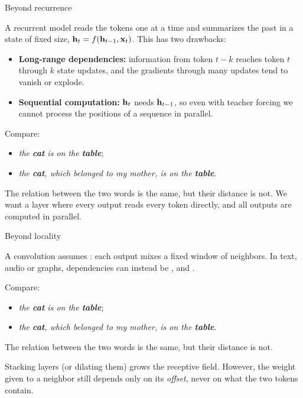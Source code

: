 \ifNNcourse
    \begin{frame}{Beyond recurrence}
        \setlength{\parskip}{6pt}

        A recurrent model reads the tokens one at a time and summarizes the past
        in a state of fixed size, $\boldsymbol{\mathbf{h}}_t=f(\boldsymbol{\mathbf{h}}_{t-1},\boldsymbol{\mathbf{x}}_t)$. This has
        two drawbacks:
        \begin{itemize}
            \item \textbf{Long-range dependencies:} information from token $t-k$
                  reaches token $t$ through $k$ state updates, and the
                  gradients through many updates tend to vanish or explode.
            \item \textbf{Sequential computation:} $\boldsymbol{\mathbf{h}}_t$ needs
                  $\boldsymbol{\mathbf{h}}_{t-1}$, so even with teacher forcing we cannot process
                  the positions of a sequence in parallel.
        \end{itemize}
        Compare:
        \begin{itemize}
            \item \textit{the {\color{darkcerulean}\textbf{cat}} is on the {\color{darkgreen}\textbf{table}}};
            \item \textit{the {\color{darkcerulean}\textbf{cat}}, which belonged to my mother, is on the {\color{darkgreen}\textbf{table}}}.
        \end{itemize}
        The relation between the two words is the same, but their distance is not.
        We want a layer where every output reads every token directly, and all
        outputs are computed in parallel.

    \end{frame}
\else
    \begin{frame}{Beyond locality}
        \setlength{\parskip}{6pt}

        A convolution assumes : each output mixes a fixed window
        of neighbors. In text, audio or graphs, dependencies can instead be
        ,  and .

        Compare:
        \begin{itemize}
            \item \textit{the {\color{darkcerulean}\textbf{cat}} is on the {\color{darkgreen}\textbf{table}}};
            \item \textit{the {\color{darkcerulean}\textbf{cat}}, which belonged to my mother, is on the {\color{darkgreen}\textbf{table}}}.
        \end{itemize}
        The relation between the two words is the same, but their distance is not.

        Stacking layers (or dilating them) grows the receptive field. However, the
        weight given to a neighbor still depends only on its \textit{offset}, never on
        what the two tokens contain.

    \end{frame}
\fi

